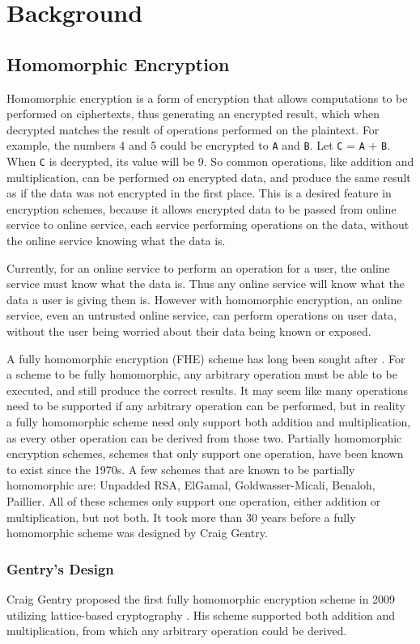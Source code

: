 \chapter{Background}
\section{Homomorphic Encryption}
Homomorphic encryption is a form of encryption that allows computations to be performed on ciphertexts, thus generating an encrypted result, which when decrypted matches the result of operations performed on the plaintext. For example, the numbers 4 and 5 could be encrypted to \verb|A| and \verb|B|. Let \verb|C| = \verb|A| $+$ \verb|B|. When \verb|C| is decrypted, its value will be 9. So common operations, like addition and multiplication, can be performed on encrypted data, and produce the same result as if the data was not encrypted in the first place. This is a desired feature in encryption schemes, because it allows encrypted data to be passed from online service to online service, each service performing operations on the data, without the online service knowing what the data is. 

Currently, for an online service to perform an operation for a user, the online service must know what the data is. Thus any online service will know what the data a user is giving them is. However with homomorphic encryption, an online service, even an untrusted online service, can perform operations on user data, without the user being worried about their data being known or exposed. 

A fully homomorphic encryption (FHE) scheme has long been sought after \cite{rivest1978data}. For a scheme to be fully homomorphic, any arbitrary operation must be able to be executed, and still produce the correct results. It may seem like many operations need to be supported if any arbitrary operation can be performed, but in reality a fully homomorphic scheme need only support both addition and multiplication, as every other operation can be derived from those two. Partially homomorphic encryption schemes, schemes that only support one operation, have been known to exist since the 1970s. A few schemes that are known to be partially homomorphic are: Unpadded RSA, ElGamal, Goldwasser-Micali, Benaloh, Paillier. All of these schemes only support one operation, either addition or multiplication, but not both. It took more than 30 years before a fully homomorphic scheme was designed by Craig Gentry.

\subsection{Gentry's Design}
Craig Gentry proposed the first fully homomorphic encryption scheme in 2009 utilizing lattice-based cryptography \cite{gentry2009fully}. His scheme supported both addition and multiplication, from which any arbitrary operation could be derived. 

